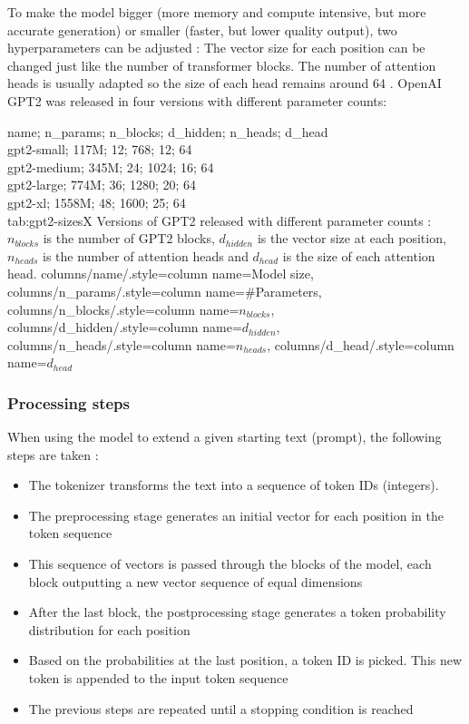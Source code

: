 To make the model bigger (more memory and compute intensive, but more accurate generation) or smaller (faster, but lower quality output), two hyperparameters can be adjusted  : The vector size for each position can be changed just like the number of transformer blocks. The number of attention heads is usually adapted so the size of each head remains around 64  \cite{hfpretrained}.
OpenAI GPT2 was released in four versions with different parameter counts:

{
    name; n_params; n_blocks; d_hidden; n_heads; d_head\\
    gpt2-small; 117M; 12; 768; 12; 64 \\
    gpt2-medium; 345M; 24; 1024; 16; 64 \\
    gpt2-large; 774M; 36; 1280; 20; 64 \\
    gpt2-xl; 1558M; 48; 1600; 25; 64 \\
}
{tab:gpt2-sizesX}
{
    Versions of GPT2 released with different parameter counts \cite{hfpretrained}: $n_{blocks}$ is the number of GPT2 blocks, $d_{hidden}$ is the vector size at each position, $n_{heads}$ is the number of attention heads and $d_{head}$ is the size of each attention head.
}
{%
    columns/name/.style={column name={Model size}},
    columns/n_params/.style={column name={\#Parameters}},
    columns/n_blocks/.style={column name={$n_{blocks}$}},
    columns/d_hidden/.style={column name={$d_{hidden}$}},
    columns/n_heads/.style={column name={$n_{heads}$}},
    columns/d_head/.style={column name={$d_{head}$}}
}

\subsubsection{Processing steps}

When using the model to extend a given starting text (prompt), the following steps are taken \cite{alammar-gpt2} :

\begin{itemize}
\item The tokenizer transforms the text into a sequence of token IDs (integers).
\item The preprocessing stage generates an initial vector for each position in the token sequence
\item This sequence of vectors is passed through the blocks of the model, each block outputting a new vector sequence of equal dimensions
\item After the last block, the postprocessing stage generates a token probability distribution for each position
\item Based on the probabilities at the last position, a token ID is picked. This new token is appended to the input token sequence
\item The previous steps are repeated until a stopping condition is reached
\end{itemize}

